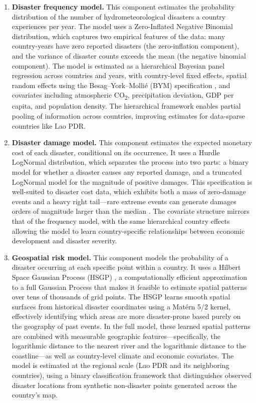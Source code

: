 \documentclass[11pt,a4paper]{article}
\begin{document}
\begin{enumerate}[leftmargin=2em]
  \item \textbf{Disaster frequency model.} This component estimates the probability distribution of the number of hydrometeorological disasters a country experiences per year. The model uses a Zero-Inflated Negative Binomial distribution, which captures two empirical features of the data: many country-years have zero reported disasters (the zero-inflation component), and the variance of disaster counts exceeds the mean (the negative binomial component). The model is estimated as a hierarchical Bayesian panel regression across countries and years, with country-level fixed effects, spatial random effects using the Besag--York--Molli\'{e} (BYM) specification \cite{besag1991}, and covariates including atmospheric CO\textsubscript{2}, precipitation deviation, GDP per capita, and population density. The hierarchical framework enables partial pooling of information across countries, improving estimates for data-sparse countries like Lao PDR.

  \item \textbf{Disaster damage model.} This component estimates the expected monetary cost of each disaster, conditional on its occurrence. It uses a Hurdle LogNormal distribution, which separates the process into two parts: a binary model for whether a disaster causes any reported damage, and a truncated LogNormal model for the magnitude of positive damages. This specification is well-suited to disaster cost data, which exhibits both a mass of zero-damage events and a heavy right tail---rare extreme events can generate damages orders of magnitude larger than the median \cite{cavallo2011, howard2017}. The covariate structure mirrors that of the frequency model, with the same hierarchical country effects allowing the model to learn country-specific relationships between economic development and disaster severity.

  \item \textbf{Geospatial risk model.} This component models the probability of a disaster occurring at each specific point within a country. It uses a Hilbert Space Gaussian Process (HSGP) \cite{solin2020}, a computationally efficient approximation to a full Gaussian Process that makes it feasible to estimate spatial patterns over tens of thousands of grid points. The HSGP learns smooth spatial surfaces from historical disaster coordinates using a Mat\'{e}rn 5/2 kernel, effectively identifying which areas are more disaster-prone based purely on the geography of past events. In the full model, these learned spatial patterns are combined with measurable geographic features---specifically, the logarithmic distance to the nearest river \cite{lehner2013} and the logarithmic distance to the coastline---as well as country-level climate and economic covariates. The model is estimated at the regional scale (Lao PDR and its neighboring countries), using a binary classification framework that distinguishes observed disaster locations from synthetic non-disaster points generated across the country's map.


\end{enumerate}
\end{document}
